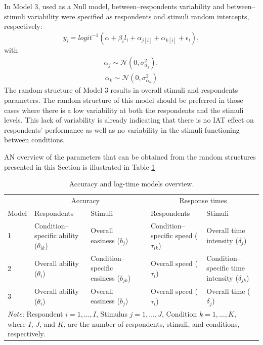 \documentclass[12pt]{book}
\begin{document}
In Model 3, used as a Null model, between--respondents variability and between--stimuli variability were specified as respondents and stimuli random intercepts, respectively:
%
\begin{equation}\label{AccuracyMin}
y_{i} = logit^{-1}(\alpha + \beta_il_i + \alpha_{j[i]} +  \alpha_{k[i]} + \epsilon_{i}),
\end{equation}
with
\begin{align}
	\alpha_{j} \sim  \mathcal{N} ( 0, \sigma_{\alpha_j}^2),
\end{align}
\begin{align}
	\alpha_{k}  \sim  \mathcal{N} (0,\sigma_{\alpha_k}^2)
\end{align}
 The random structure of Model 3 results in overall stimuli and respondents parameters. The random structure of this model should be preferred in those cases where there is a low variability at both the respondents and the stimuli levels. This lack of variability is already indicating that there is no IAT effect on respondents' performance as well as no variability in the stimuli functioning between conditions. 
 
 AN overview of the parameters that can be obtained from the random structures presented in this Section is illustrated in Table \ref{tab:paroverview}
 \begin{table}[h!]
 	\centering\doublespacing
 	\caption{Accuracy and log-time models overview.}
 	\label{tab:paroverview} 
 	\begin{tabularx}{\textwidth}{p{0.8cm} p{3cm} p{3cm} p{0.3cm} p{3cm} p{3cm} }
 		\toprule
 		&\multicolumn{2}{c}{Accuracy}
 		& & 
 		\multicolumn{2}{c}{Response times}\\ 
 		\cline{2-3}\cline{5-6} 
 		Model & Respondents & Stimuli & & Respondents & Stimuli \\
 		\midrule
 		1 & Condition--specific ability ($\theta_{ik}$) & Overall easiness ($b_j$) & & Condition--specific speed  ($\tau_{ik}$)   & Overall time intensity ($\delta_{j}$) \\
 		2 & Overall ability ($\theta_i$) & Condition--specific easiness ($b_{jk}$) &  & Overall speed ($\tau_i$)  & Condition--specific time intensity ($\delta_{jk}$)  \\
 		3 & Overall ability ($\theta_i$) & Overall easiness  ($b_j$) & & Overall speed ($\tau_i$) & Overall time ($\delta_j$) \\ 
 		\bottomrule
 		\multicolumn{6}{p{15cm}}{\footnotesize{\emph{Note:} Respondent $i = 1, \ldots, I$,  Stimulus $j = 1,\ldots, J$, Condition $k = 1,\ldots, K$, where $I$, $J$, and $K$, are the number of respondents, stimuli, and conditions, respectively.}}
 	\end{tabularx}
 \end{table}
\end{document}
